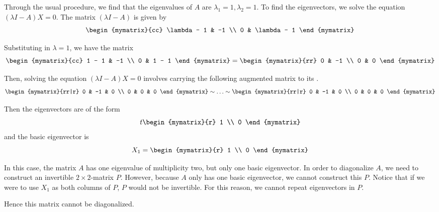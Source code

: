 \begin{solution}
Through the usual procedure, we find that the eigenvalues of $A$ are $\lambda_1 =1, \lambda_2=1$. 
To find the eigenvectors, we solve the equation $(\lambda I - A) X = 0$.
The matrix $(\lambda I -A)$ is given by 
\begin{equation*}
\begin{mymatrix}{cc}
\lambda - 1 & -1 \\
0 & \lambda - 1
\end{mymatrix}
\end{equation*}

Substituting in $\lambda = 1$, we have the matrix
\begin{equation*}
\begin{mymatrix}{cc}
1 - 1 & -1 \\
0 & 1 - 1
\end{mymatrix}
=
\begin{mymatrix}{rr}
0 & -1 \\
0 & 0
\end{mymatrix}
\end{equation*}

Then, solving the equation $(\lambda I - A) X = 0$ 
involves carrying the following augmented matrix to its {\rref}. 
\begin{equation*}
\begin{mymatrix}{rr|r}
0 & -1 & 0 \\
0 & 0 & 0
\end{mymatrix} 
\sim\ldots\sim
\begin{mymatrix}{rr|r}
0 & -1 & 0 \\
0 & 0 & 0
\end{mymatrix} 
\end{equation*}

Then the eigenvectors are of the form
\begin{equation*}
t\begin{mymatrix}{r}
1 \\
0
\end{mymatrix}
\end{equation*}
and the basic eigenvector is 
\begin{equation*}
X_1
=
\begin{mymatrix}{r}
1 \\
0
\end{mymatrix}
\end{equation*}

In this case, the matrix $A$ has one eigenvalue of multiplicity two, 
but only one basic eigenvector. In order to diagonalize $A$, we need to construct
an invertible $2\times 2$-matrix $P$. However, because $A$ only has one basic eigenvector,
we cannot construct this $P$. Notice that if we were to use $X_1$ as both columns of $P$, $P$ would not be invertible. For this reason, we cannot repeat eigenvectors in $P$.

Hence this matrix cannot be diagonalized. 
\end{solution}


